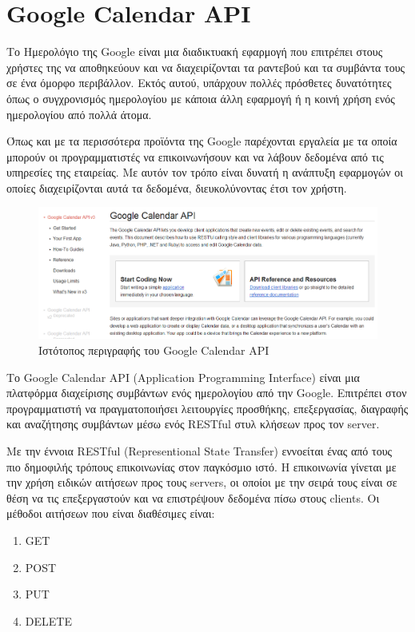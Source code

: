
\chapter{Google Calendar API}
Το Ημερολόγιο της Google είναι μια διαδικτυακή εφαρμογή που επιτρέπει στους χρήστες της να αποθηκεύουν και να διαχειρίζονται τα ραντεβού και τα συμβάντα τους σε ένα όμορφο περιβάλλον. Εκτός αυτού, υπάρχουν πολλές πρόσθετες δυνατότητες όπως ο συγχρονισμός ημερολογίου με κάποια άλλη εφαρμογή ή η κοινή χρήση ενός ημερολογίου από 
πολλά άτομα.

Όπως και με τα περισσότερα προϊόντα της Google παρέχονται εργαλεία με τα οποία μπορούν οι προγραμματιστές να επικοινωνήσουν και να λάβουν δεδομένα από τις υπηρεσίες της εταιρείας. Με 
αυτόν τον τρόπο είναι δυνατή η ανάπτυξη εφαρμογών οι οποίες διαχειρίζονται αυτά τα δεδομένα, διευκολύνοντας έτσι τον χρήστη.

\begin{figure}[h]
\centering
\includegraphics[width=150mm]{images/google-calendar-api.png}
\caption{Ιστότοπος περιγραφής του Google Calendar API}
\label{google-calendar-api}
\end{figure}

Το Google Calendar API (Application Programming Interface) 
είναι μια πλατφόρμα διαχείρισης συμβάντων ενός ημερολογίου από την Google. Επιτρέπει στον προγραμματιστή να πραγματοποιήσει λειτουργίες προσθήκης, επεξεργασίας, διαγραφής και αναζήτησης συμβάντων μέσω ενός RESTful στυλ κλήσεων προς τον server.

Με την έννοια RESTful (Representional State Transfer) εννοείται ένας από τους πιο δημοφιλής τρόπους επικοινωνίας στον παγκόσμιο ιστό. Η επικοινωνία γίνεται με την χρήση ειδικών αιτήσεων προς τους servers, οι οποίοι με την σειρά τους είναι σε θέση να τις επεξεργαστούν και να επιστρέψουν δεδομένα πίσω στους clients. Οι μέθοδοι αιτήσεων που είναι διαθέσιμες είναι:
\begin{enumerate}
\item GET
\item POST
\item PUT
\item DELETE
\end{enumerate}

